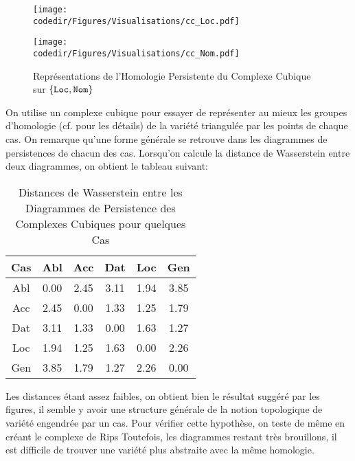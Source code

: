 \documentclass{cours}
\newcommand{\codedir}{Morphosyntactic-Categories_Code}
\begin{document}
\begin{figure}[H]
    \begin{minipage}{.5\textwidth}
        \begin{center}
            \texttt{[image: \\codedir/Figures/Visualisations/cc\_Loc.pdf]}
        \end{center}
    \end{minipage}
    \begin{minipage}{.5\textwidth}
        \begin{center}
            \texttt{[image: \\codedir/Figures/Visualisations/cc\_Nom.pdf]}
        \end{center}
    \end{minipage}
    \caption{Représentations de l'Homologie Persistente du Complexe Cubique sur $\{\tt Loc,Nom\}$}
\end{figure}

On utilise un complexe cubique pour essayer de représenter au mieux les groupes d'homologie (cf.  pour les détails) de la variété triangulée par les points de chaque cas.
On remarque qu'une forme générale se retrouve dans les diagrammes de persistences de chacun des cas.
Lorsqu'on calcule la distance de Wasserstein entre deux diagrammes, on obtient le tableau suivant:
\begin{table}[H]
	\centering
	\begin{tabular}{c|ccccc}
		\toprule
		Cas & Abl & Acc & Dat & Loc & Gen\\
		\midrule
		Abl & 0.00 & 2.45 & 3.11 & 1.94 & 3.85\\
		Acc & 2.45 & 0.00 & 1.33 & 1.25 & 1.79\\
		Dat & 3.11 & 1.33 & 0.00 & 1.63 & 1.27\\
		Loc & 1.94 & 1.25 & 1.63 & 0.00 & 2.26\\
		Gen & 3.85 & 1.79 & 1.27 & 2.26 & 0.00\\
		\bottomrule
	\end{tabular}
	\caption{Distances de Wasserstein entre les Diagrammes de Persistence des Complexes Cubiques pour quelques Cas}
\end{table}
Les distances étant assez faibles, on obtient bien le résultat suggéré par les figures, il semble y avoir une structure générale de la notion topologique de variété engendrée par un cas.
Pour vérifier cette hypothèse, on teste de même en créant le complexe de Rips
Toutefois, les diagrammes restant très brouillons, il est difficile de trouver une variété plus abstraite avec la même homologie.
\end{document}
